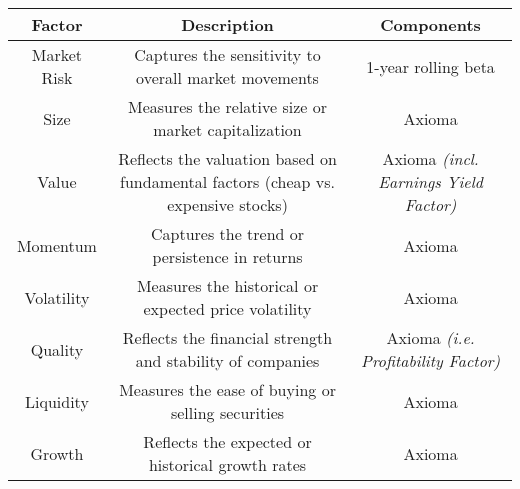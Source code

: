 \begin{tabular}{||c c c||}
    \hline
    \rowcolor{LGray}
    \textbf{Factor} & \textbf{Description} & \textbf{Components} \\
    \hline\hline
    Market Risk & Captures the sensitivity to overall market movements & 1-year rolling beta \\
    \hline
    Size & Measures the relative size or market capitalization & Axioma \\
    \hline
    Value & Reflects the valuation based on fundamental factors (cheap vs. expensive stocks)  & Axioma \textit{(incl. Earnings Yield Factor)} \\
    \hline
    Momentum & Captures the trend or persistence in returns & Axioma \\
    \hline
    Volatility & Measures the historical or expected price volatility & Axioma \\
    \hline
    Quality & Reflects the financial strength and stability of companies & Axioma \textit{(i.e. Profitability Factor)}\\
    \hline
    Liquidity & Measures the ease of buying or selling securities & Axioma \\
    \hline
    Growth & Reflects the expected or historical growth rates & Axioma \\
    \hline
\end{tabular}